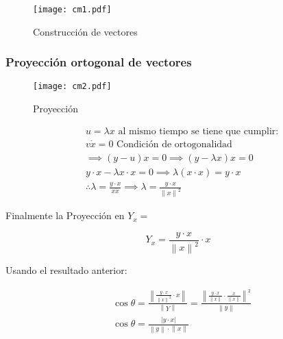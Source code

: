 \begin{figure}[h!]
	\centering
	\texttt{[image: cm1.pdf]}
	\caption{Construcción de vectores}
\end{figure}

\subsubsection{Proyección ortogonal de vectores}

\begin{figure}[h!]
	\centering
	\texttt{[image: cm2.pdf]}
	\caption{Proyección}
\end{figure}

\begin{align*}
	 & u=\lambda x \text{ al mismo tiempo se tiene que cumplir:}                                                \\
	 & v\dot x=0 \text{ Condición de ortogonalidad}                                                             \\
	 & \implies (y-u)x=0\implies (y-\lambda x)x=0                                                               \\
	 & y\cdot x-\lambda x\cdot x=0\implies \lambda (x\cdot x)=y\cdot x                                          \\
	 & \therefore \lambda=\frac{y\cdot x}{x\dot x}\implies \lambda=\frac{y\cdot x}{\left\lVert x\right\rVert^2}
\end{align*}

Finalmente la Proyección en $Y_x=$

\begin{equation}
	Y_x=\frac{y\cdot x}{\left\lVert x\right\rVert^2}\cdot x
\end{equation}

Usando el resultado anterior:

\begin{align*}
	 & \cos \theta=\frac{\left\lVert \frac{y\cdot x}{\left\lVert x\right\rVert^2} \cdot x\right\rVert}{\left\lVert Y\right\rVert}=\frac{\left\lVert \frac{y\cdot x}{\left\lVert x\right\rVert}\cdot \frac{x}{\left\lVert x\right\rVert}\right\rVert^2}{\left\lVert y\right\rVert} \\
	 & \cos \theta=\frac{\left\lvert y\cdot x\right\rvert }{\left\lVert y\right\rVert\cdot \left\lVert x\right\rVert}
\end{align*}

